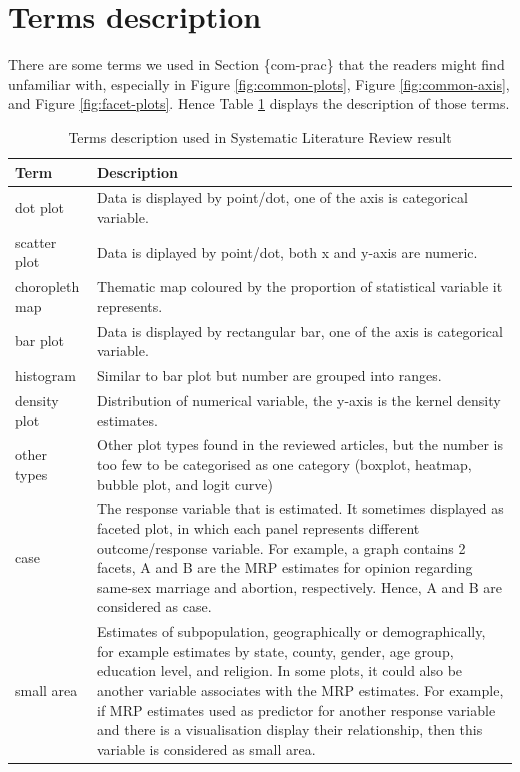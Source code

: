 \documentclass{monashthesis}
\begin{document}
\hypertarget{terms}{%
\section{Terms description}\label{terms}}

There are some terms we used in Section \{com-prac\} that the readers might find unfamiliar with, especially in Figure \ref{fig:common-plots}, Figure \ref{fig:common-axis}, and Figure \ref{fig:facet-plots}. Hence Table \ref{tab:terms-desc} displays the description of those terms.

\begin{table}

\caption{\label{tab:terms-desc}Terms description used in Systematic Literature Review result}
\centering
\begin{tabular}[t]{l>{\raggedright\arraybackslash}p{30em}}
\toprule
Term & Description\\
\midrule
dot plot & Data is displayed by point/dot, one of the axis is categorical variable.\\
scatter plot & Data is diplayed by point/dot, both x and y-axis are numeric.\\
choropleth map & Thematic map coloured by the proportion of statistical variable it represents.\\
bar plot & Data is displayed by rectangular bar, one of the axis is categorical variable.\\
histogram & Similar to bar plot but number are grouped into ranges.\\
\addlinespace
density plot & Distribution of numerical variable, the y-axis is the kernel density estimates.\\
other types & Other plot types found in the reviewed articles, but the number is too few to be categorised as one category (boxplot, heatmap, bubble plot, and logit curve)\\
case & The response variable that is estimated. It sometimes displayed as faceted plot, in which each panel represents different outcome/response variable. For example, a graph contains 2 facets, A and B are the MRP estimates for opinion regarding same-sex marriage and abortion, respectively. Hence, A and B are considered as case.\\
small area & Estimates of subpopulation, geographically or demographically, for example estimates by state, county, gender, age group, education level, and religion. In some plots, it could also be another variable associates with the MRP estimates. For example, if MRP estimates used as predictor for another response variable and there is a visualisation display their relationship, then this variable is considered as small area.\\
\bottomrule
\end{tabular}
\end{table}
\end{document}
